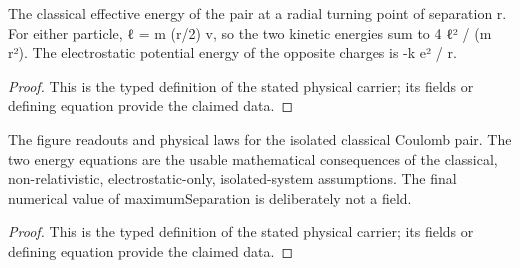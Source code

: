 \begin{definition}
  \label{def:physics:IPhO_2026_1_B_1:aux012}
  The classical effective energy of the pair at a radial turning point of separation r. For either particle, ℓ = m (r/2) v, so the two kinetic energies sum to 4 ℓ² / (m r²). The electrostatic potential energy of the opposite charges is -k e² / r.
\end{definition}
\begin{proof}
  This is the typed definition of the stated physical carrier; its fields or defining equation provide the claimed data.
\end{proof}

\begin{definition}
  \label{def:physics:IPhO_2026_1_B_1:aux013}
  The figure readouts and physical laws for the isolated classical Coulomb pair. The two energy equations are the usable mathematical consequences of the classical, non-relativistic, electrostatic-only, isolated-system assumptions. The final numerical value of maximumSeparation is deliberately not a field.
\end{definition}
\begin{proof}
  This is the typed definition of the stated physical carrier; its fields or defining equation provide the claimed data.
\end{proof}
